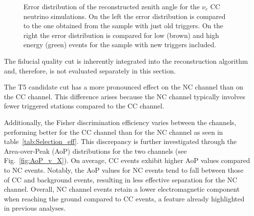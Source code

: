 \begin{figure}[h!]
  \centering
  \hfill
  \caption{Error distribution of the reconstructed zenith angle for the $\nu_e$ CC neutrino simulations. On the left the error distribution is compared to the one obtained from the sample with just old triggers. On the right the error distribution is compared for low (brown) and high energy (green) events for the sample with new triggers included.} 
  \label{fig:Theta_err_comp}
\end{figure}

The fiducial quality cut is inherently integrated into the reconstruction algorithm and, therefore, is not evaluated separately in this section.

The T5 candidate cut has a more pronounced effect on the NC channel than on the CC channel. This difference arises because the NC channel typically involves fewer triggered stations compared to the CC channel.


Additionally, the Fisher discrimination efficiency varies between the channels, performing better for the CC channel than for the NC channel as seen in table~\ref{tab:Selection_eff}. This discrepancy is further investigated through the Area-over-Peak (AoP) distributions for the two channels (see Fig.~\ref{fig:AoP_v_X}). On average, CC events exhibit higher AoP values compared to NC events. Notably, the AoP values for NC events tend to fall between those of CC and background events, resulting in less effective separation for the NC channel. Overall, NC channel events retain a lower electromagnetic component when reaching the ground compared to CC events, a feature already highlighted in previous analyses.

